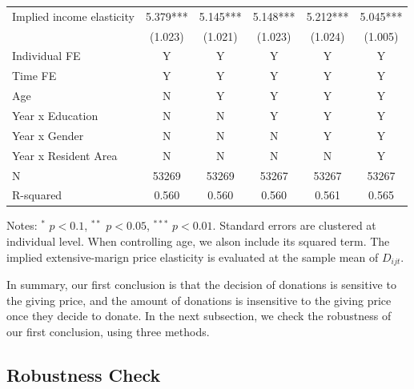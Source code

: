 \documentclass[ review  , 3p ]{elsarticle}
\begin{document}
\begin{table}
\begin{threeparttable}
\begin{tabular}[t]{lccccc}
  \hspace{1em}Implied income elasticity & 5.379*** & 5.145*** & 5.148*** & 5.212*** & 5.045***\\
  \hspace{1em} & (1.023) & (1.021) & (1.023) & (1.024) & (1.005)\\
  \hspace{1em}Individual FE & Y & Y & Y & Y & Y\\
  \hspace{1em}Time FE & Y & Y & Y & Y & Y\\
  \hspace{1em}Age & N & Y & Y & Y & Y\\
  \hspace{1em}Year x Education & N & N & Y & Y & Y\\
  \hspace{1em}Year x Gender & N & N & N & Y & Y\\
  \hspace{1em}Year x Resident Area & N & N & N & N & Y\\
  \hspace{1em}N & 53269 & 53269 & 53267 & 53267 & 53267\\
  \hspace{1em}R-squared & 0.560 & 0.560 & 0.560 & 0.561 & 0.565\\
  \bottomrule
  \end{tabular}
  \begin{tablenotes}
  \item Notes: $^{*}$ $p < 0.1$, $^{**}$ $p < 0.05$, $^{***}$ $p < 0.01$. Standard errors are clustered at individual level. When controlling age, we alson include its squared term. The implied extensive-marign price elasticity is evaluated at the sample mean of $D_{ijt}$.
  \end{tablenotes}
  \end{threeparttable}
  \end{table}

  In summary, our first conclusion is that
  the decision of donations is sensitive to the giving price,
  and the amount of donations is insensitive to the giving price once they decide to donate.
  In the next subsection, we check the robustness of our first conclusion, using three methods.

  \hypertarget{robustness-check}{%
  \subsection{Robustness Check}\label{robustness-check}}
\end{document}
